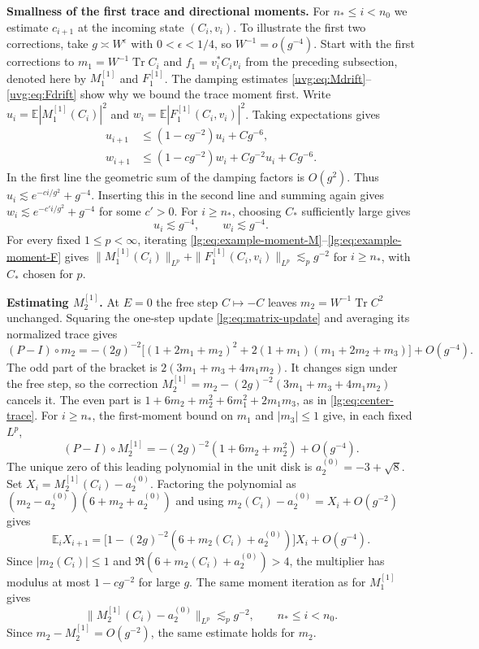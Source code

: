 \documentclass[11pt]{article}
\numberwithin{equation}{section}
\theoremstyle{remark}
\newcommand{\E}{\mathbb E}
\newcommand{\Tr}{\operatorname{Tr}}
\begin{document}
\medskip\noindent\textbf{Smallness of the first trace and directional moments.}
For $n_*\le i<n_0$ we estimate $c_{i+1}$ at the incoming state
$(C_i,v_i)$. To illustrate the first two corrections, take
$g\asymp W^\epsilon$ with $0<\epsilon<1/4$, so $W^{-1}=o(g^{-4})$.
Start with the first corrections to $m_1=W^{-1}\Tr C_i$
and $f_1=v_i^*C_i v_i$ from the preceding subsection, denoted here
by $M_1^{[1]}$ and $F_1^{[1]}$. The damping estimates
\eqref{uvg:eq:Mdrift}--\eqref{uvg:eq:Fdrift} show why we bound the
trace moment first. Write $u_i=\E|M_1^{[1]}(C_i)|^2$ and
$w_i=\E|F_1^{[1]}(C_i,v_i)|^2$. Taking expectations gives
\[
 \begin{aligned}
 u_{i+1}&\le(1-cg^{-2})u_i+Cg^{-6},\\
 w_{i+1}&\le(1-cg^{-2})w_i
               +Cg^{-2}u_i+Cg^{-6}.
 \end{aligned}
\]
In the first line the geometric sum of the damping factors is $O(g^2)$.
Thus $u_i\lesssim e^{-ci/g^2}+g^{-4}$. Inserting this in the
second line and summing again gives
$w_i\lesssim e^{-c'i/g^2}+g^{-4}$ for some $c'>0$.
For $i\ge n_*$, choosing $C_*$ sufficiently large gives
\[
 u_i\lesssim g^{-4},\qquad w_i\lesssim g^{-4}.
\]
For every fixed $1\le p<\infty$, iterating
\eqref{lg:eq:example-moment-M}--\eqref{lg:eq:example-moment-F} gives
$\|M_1^{[1]}(C_i)\|_{L^p}+\|F_1^{[1]}(C_i,v_i)\|_{L^p}\lesssim_p g^{-2}$
for $i\ge n_*$, with $C_*$ chosen for $p$.

\medskip\noindent\textbf{Estimating $M_2^{[1]}$.}
At $E=0$ the free step $C\mapsto-C$ leaves $m_2=W^{-1}\Tr C^2$
unchanged. Squaring the one-step update \eqref{lg:eq:matrix-update}
and averaging its normalized trace gives
\[
 (P-I)\circ m_2=-(2g)^{-2}
 \bigl[(1+2m_1+m_2)^2+2(1+m_1)(m_1+2m_2+m_3)\bigr]+O(g^{-4}).
\]
The odd part of the bracket is $2(3m_1+m_3+4m_1m_2)$. It changes
sign under the free step, so the correction
$M_2^{[1]}=m_2-(2g)^{-2}(3m_1+m_3+4m_1m_2)$ cancels it.
The even part is $1+6m_2+m_2^2+6m_1^2+2m_1m_3$, as in
\eqref{lg:eq:center-trace}. For $i\ge n_*$, the first-moment bound
on $m_1$ and $|m_3|\le1$ give, in each fixed $L^p$,
\[
 (P-I)\circ M_2^{[1]}
 =-(2g)^{-2}(1+6m_2+m_2^2)+O(g^{-4}).
\]
The unique zero of this leading polynomial in the
unit disk is $a_2^{(0)}=-3+\sqrt8$. Set $X_i=M_2^{[1]}(C_i)-a_2^{(0)}$.
Factoring the polynomial as $(m_2-a_2^{(0)})(6+m_2+a_2^{(0)})$
and using $m_2(C_i)-a_2^{(0)}=X_i+O(g^{-2})$ gives
\[
 \E_i X_{i+1}
 =\bigl[1-(2g)^{-2}(6+m_2(C_i)+a_2^{(0)})\bigr]X_i+O(g^{-4}).
\]
Since $|m_2(C_i)|\le1$ and $\Re(6+m_2(C_i)+a_2^{(0)})>4$, the
multiplier has modulus at most $1-cg^{-2}$ for large $g$.
The same moment iteration as for $M_1^{[1]}$ gives
\[
 \|M_2^{[1]}(C_i)-a_2^{(0)}\|_{L^p}\lesssim_p g^{-2},
 \qquad n_*\le i<n_0.
\]
Since $m_2-M_2^{[1]}=O(g^{-2})$, the same estimate holds for $m_2$.
\end{document}
